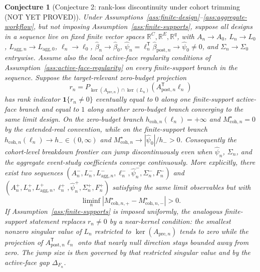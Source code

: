 \documentclass[11pt]{article}
\newcommand{\one}{\mathbf{1}}
\newcommand{\transpose}{\mathsf{T}}
\newcommand{\R}{\mathbb{R}}
\theoremstyle{definition}
\theoremstyle{plain}
\newtheorem{conjecture}{Conjecture}
\theoremstyle{remark}
\begin{document}
\begin{conjecture}[Conjecture 2: rank-loss discontinuity under cohort trimming (NOT YET PROVED)]\label{conj:rank-loss}
Under Assumptions~\ref{ass:finite-design}--\ref{ass:aggregate-workflow}, but not imposing Assumption~\ref{ass:finite-supports}, suppose all designs in a sequence live on fixed finite vector spaces \(\R^C,\R^E,\R^q\), with \(A_n\to A_0\), \(L_n\to L_0\), \(L_{\mathrm{agg},n}\to L_{\mathrm{agg},0}\), \(\ell_n\to\ell_0\), \(\hat\beta_n\to\hat\beta_0\), \(\hat\psi_n=\ell_n^\transpose\hat\beta_{\mathrm{post},n}\to\hat\psi_0\ne0\), and \(\Sigma_n\to\Sigma_0\) entrywise.
Assume also the local active-face regularity conditions of Assumption~\ref{ass:active-face-regularity} on every finite-support branch in the sequence.
Suppose the target-relevant zero-budget projection
\[
  r_n
  =
  P_{\ker(A_{\mathrm{pre},n})\cap\ker(L_n)}
  (A_{\mathrm{post},n}^\transpose\ell_n)
\]
has rank indicator \(\one\{r_n\ne0\}\) eventually equal to \(0\) along one finite-support active-face branch and equal to \(1\) along another zero-budget branch converging to the same limit design.
On the zero-budget branch \(h_{\mathrm{coh},n}(\ell_n)=+\infty\) and \(M_{\mathrm{coh},n}^\star=0\) by the extended-real convention, while on the finite-support branch \(h_{\mathrm{coh},n}(\ell_n)\to h_-\in(0,\infty)\) and \(M_{\mathrm{coh},n}^\star\to|\hat\psi_0|/h_->0\).
Consequently the cohort-level breakdown frontier can jump discontinuously even when \(\hat\psi_n\), \(\Sigma_n\), and the aggregate event-study coefficients converge continuously.
More explicitly, there exist two sequences \((A_n^-,L_n^-,L_{\mathrm{agg},n}^-,\ell_n^-,\hat\psi_n^-,\Sigma_n^-,F_n^-)\) and \((A_n^+,L_n^+,L_{\mathrm{agg},n}^+,\ell_n^+,\hat\psi_n^+,\Sigma_n^+,F_n^+)\) satisfying the same limit observables but with
\[
  \liminf_n |M_{\mathrm{coh},n,+}^\star-M_{\mathrm{coh},n,-}^\star|>0.
\]
If Assumption~\ref{ass:finite-supports} is imposed uniformly, the analogous finite-support statement replaces \(r_n\ne0\) by a near-kernel condition: the smallest nonzero singular value of \(L_n\) restricted to \(\ker(A_{\mathrm{pre},n})\) tends to zero while the projection of \(A_{\mathrm{post},n}^\transpose\ell_n\) onto that nearly null direction stays bounded away from zero.
The jump size is then governed by that restricted singular value and by the active-face gap \(\Delta_{F_n}\).
\end{conjecture}
\end{document}
